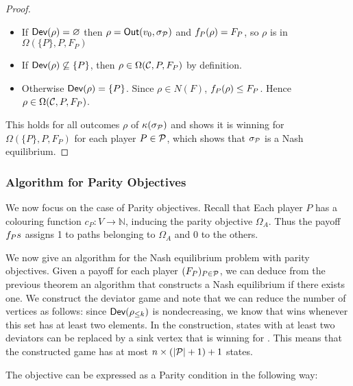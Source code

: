 \begin{proof}
\begin{itemize}

\item   If \(\textsf{Dev}(\rho) = \varnothing\) then \(\rho = \textsf{Out}(v_0, \sigma_{\mathcal{P}})\) and
  \(f_P(\rho) = F_P\), so \(\rho\) is in
  \(\Omega(\{P\},P, F_P)\)
\item   If \(\textsf{Dev}(\rho) \not\subseteq \{ P \}\), then
  \(\rho \in \Omega(\mathcal{C},P,F_P)\) by definition.
\item   Otherwise \(\textsf{Dev}(\rho) = \{P\}\). Since \(\rho \in N(F)\),
  \(f_P(\rho) \le F_P\). Hence
  \(\rho \in \Omega(\mathcal{C},P,F_P)\).
\end{itemize}

This holds for all outcomes \(\rho\) of \(\kappa(\sigma_{\mathcal{P}})\) and shows
it is winning for \(\Omega(\{P\},P,F_P)\) for each
player \(P\in \mathcal{P}\), which shows that \(\sigma_{\mathcal{P}}\) is a Nash
equilibrium.
\end{proof}


\subsubsection{Algorithm for Parity Objectives}
\label{13-subsec:algorithm-for-parity-objectives}
We now focus on the case of Parity objectives.
Recall that
Each player $P$ has
a colouring function $c_P : V \rightarrow \mathbb{N}$, inducing the parity objective $\Omega_A$.
%
Thus the payoff $f_Ps$ assigns 1 to paths belonging to $\Omega_A$ and 0
to the others.

We now give an algorithm for the Nash equilibrium problem with parity
objectives. Given a payoff for each player \((F_P)_{P\in \mathcal{P}} \),
we can deduce from the previous theorem an algorithm that
constructs a Nash equilibrium if there exists one. We construct the
deviator game and note that we can reduce the number of vertices as
follows: since  \(\textsf{Dev}(\rho_{\le k})\) is nondecreasing,
we know that \Eve wins whenever this set has at least two elements.
In the construction, states with at least two deviators can be replaced by a
sink vertex that is winning for \Eve. This means that the constructed
game has at most \(n \times (|\mathcal{P}| + 1) + 1\) states.

The objective can be expressed as a Parity condition in the following
way:

